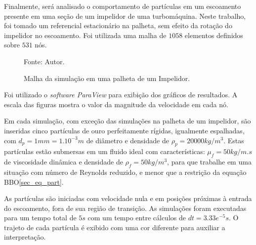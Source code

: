 \begin{itemize}
        Finalmente, será analisado o comportamento de partículas em um escoamento presente em uma seção de um impelidor de uma turbomáquina.
        Neste trabalho, foi tomado um referencial estacionário na palheta, sem efeito da rotação do impelidor no escoamento.
        Foi utilizada uma malha de $1058$ elementos definidos sobre $531$ nós.
        \begin{figure}[H]
            \centering
             {\raggedleft \scriptsize Fonte: Autor.}
            \caption{Malha da simulação em uma palheta de um Impelidor.}
            \label{rotor_mesh}
        \end{figure}
\end{itemize}

Foi utilizado o \textit{software ParaView} para exibição dos gráficos de resultados.
A escala das figuras mostra o valor da magnitude da velocidade em cada nó.

Em cada simulação, com exceção das simulações na palheta de um impelidor, são inseridas cinco partículas de ouro perfeitamente rígidas, igualmente espalhadas, com $d_p=1mm=1.10^{-3}m$ de diâmetro e densidade de $\rho_p=20000kg/m^3$.
Estas partículas estão submersas em um fluido ideal com características: $\mu_f=50kg/m.s$ de viscosidade dinâmica e densidade de $\rho_f=50kg/m^3$, para que trabalhe em uma situação com número de Reynolds reduzido, e menor que a restrição da equação BBO\eqref{sec_eq_part}.

As partículas são iniciadas com velocidade nula e em posições próximas à entrada do escoamento, fora de sua região de transição.
As simulações foram executadas para um tempo total de $5s$ com um tempo entre cálculos de $dt=3.33e^{-5}s$.
O trajeto de cada partícula é exibido com uma cor diferente para auxiliar a interpretação. 

